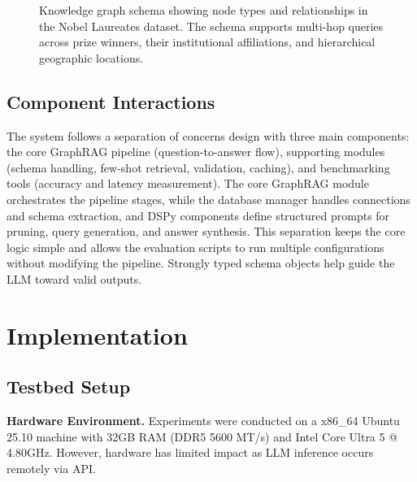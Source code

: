 \documentclass[sigconf]{acmart}
\begin{document}
\begin{figure}[t]
\begin{tikzpicture}[
      scale=0.7,
      every node/.style={transform shape},
      class/.style={rectangle split, rectangle split parts=2, draw, text width=2.2cm, align=center},
      arrow/.style={->,>=latex}
    ]
  \end{tikzpicture}
  \caption{Knowledge graph schema showing node types and relationships in the Nobel Laureates dataset. The schema supports multi-hop queries across prize winners, their institutional affiliations, and hierarchical geographic locations.}
  \label{fig:schema}
\end{figure}

\subsection{Component Interactions}
\label{sec:components}

The system follows a separation of concerns design with three main components: the core GraphRAG pipeline (question-to-answer flow), supporting modules (schema handling, few-shot retrieval, validation, caching), and benchmarking tools (accuracy and latency measurement). The core GraphRAG module orchestrates the pipeline stages, while the database manager handles connections and schema extraction, and DSPy components define structured prompts for pruning, query generation, and answer synthesis. This separation keeps the core logic simple and allows the evaluation scripts to run multiple configurations without modifying the pipeline. Strongly typed schema objects help guide the LLM toward valid outputs.

\section{Implementation}
\label{sec:implementation}

\subsection{Testbed Setup}
\label{sec:testbed}

\textbf{Hardware Environment.} Experiments were conducted on a x86\_64 Ubuntu 25.10 machine with 32GB RAM (DDR5 5600 MT/s) and Intel Core Ultra 5 @ 4.80GHz. However, hardware has limited impact as LLM inference occurs remotely via API.
\end{document}
